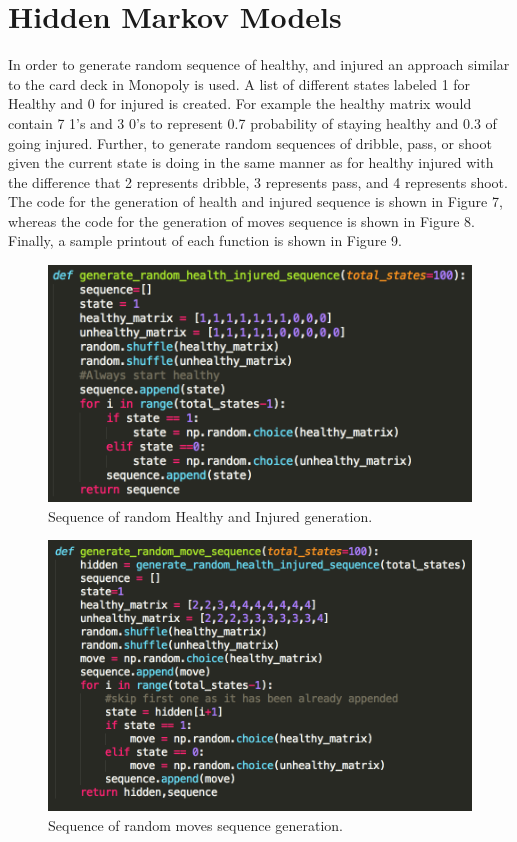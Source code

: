 \documentclass[12pt, letter]{article}
\begin{document}
\FloatBarrier


\section{Hidden Markov Models}

In order to generate random sequence of healthy, and injured an approach similar to the card deck in Monopoly is used. A list of different states labeled 1 for Healthy and 0 for injured is created. For example the healthy matrix would contain 7 1's and 3 0's to represent 0.7 probability of staying healthy and 0.3 of going injured. Further, to generate random sequences of dribble, pass, or shoot given the current state is doing in the same manner as for healthy injured with the difference that 2 represents dribble, 3 represents pass, and 4 represents shoot. The code for the generation of health and injured sequence  is shown in Figure 7, whereas the code for the generation of moves sequence is shown in Figure 8. Finally, a sample printout of each function is shown in Figure 9. 

 \begin{figure}[htb]
  \centering
  \includegraphics[width=0.70 \textwidth]{./figures/h_i_seq.png}
  \caption{Sequence of random Healthy and Injured generation.}
\end{figure}

 \begin{figure}[htb]
  \centering
  \includegraphics[width=0.70 \textwidth]{./figures/move_seq.png}
  \caption{Sequence of random moves sequence generation.}
\end{figure}
\end{document}
